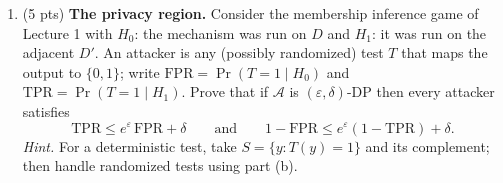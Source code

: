\documentclass[11pt]{article}
\newcommand{\cA}{\mathcal{A}}
\newcommand{\cS}{\mathcal{S}}
\newcommand{\FPR}{\mathrm{FPR}}
\newcommand{\TPR}{\mathrm{TPR}}
\newcommand{\eps}{\varepsilon}
\newenvironment{answer}{\par\medskip\noindent\textbf{Answer.}\ }{\par\bigskip}
\begin{document}
\begin{enumerate}
\begin{answer}

Let $D,D'$ be any adjacent datasets.
For any $y\in\cS_1$ and $z\in\cS_2$,
by conditional probability,

\[
\begin{aligned}
&\Pr(\cA(D)=(y,z))\\
&=\Pr(Y_1=y)\Pr(Y_2=z\mid Y_1=y)\\
&=\Pr(\cA_1(D)=y)
  \Pr(\cA_2(D,y)=z).
\end{aligned}
\]

The last equality holds because the internal
randomness of $\cA_1$ and $\cA_2$ is independent.

Since $\cA_1$ is $\eps_1$-DP,

\[
\Pr(\cA_1(D)=y)
\le e^{\eps_1}\Pr(\cA_1(D')=y).
\]

For every fixed $y$, $\cA_2(\cdot,y)$
is $\eps_2$-DP, so

\[
\Pr(\cA_2(D,y)=z)
\le e^{\eps_2}\Pr(\cA_2(D',y)=z).
\]

Combining these inequalities,

\[
\begin{aligned}
&\Pr(\cA(D)=(y,z))\\
&\le e^{\eps_1+\eps_2}
  \Pr(\cA_1(D')=y)
  \Pr(\cA_2(D',y)=z)\\
&=e^{\eps_1+\eps_2}
  \Pr(\cA(D')=(y,z)).
\end{aligned}
\]

For any subset $S\subseteq\cS_1\times\cS_2$,
summing over all $(y,z)\in S$ gives

\[
\begin{aligned}
\Pr(\cA(D)\in S)
&=\sum_{(y,z)\in S}
  \Pr(\cA(D)=(y,z))\\
&\le e^{\eps_1+\eps_2}
  \sum_{(y,z)\in S}
  \Pr(\cA(D')=(y,z))\\
&=e^{\eps_1+\eps_2}
  \Pr(\cA(D')\in S).
\end{aligned}
\]

Therefore, $\cA$ is
$(\eps_1+\eps_2)$-DP.

\end{answer}

\item (5 pts) \textbf{The privacy region.} Consider the membership inference
game of Lecture 1 with $H_0$: the mechanism was run on $D$ and $H_1$: it was
run on the adjacent $D'$. An attacker is any (possibly randomized) test $T$
that maps the output to $\{0,1\}$; write $\FPR=\Pr(T=1\mid H_0)$ and
$\TPR=\Pr(T=1\mid H_1)$. Prove that if $\cA$ is $(\eps,\delta)$-DP then every
attacker satisfies
\begin{equation}\label{eq:privacy-region}
  \TPR\le e^{\eps}\,\FPR+\delta
  \qquad\text{and}\qquad
  1-\FPR\le e^{\eps}(1-\TPR)+\delta.
\end{equation}
\textit{Hint.} For a deterministic test, take $S=\{y:T(y)=1\}$ and its
complement; then handle randomized tests using part (b).


\end{enumerate}
\end{document}

